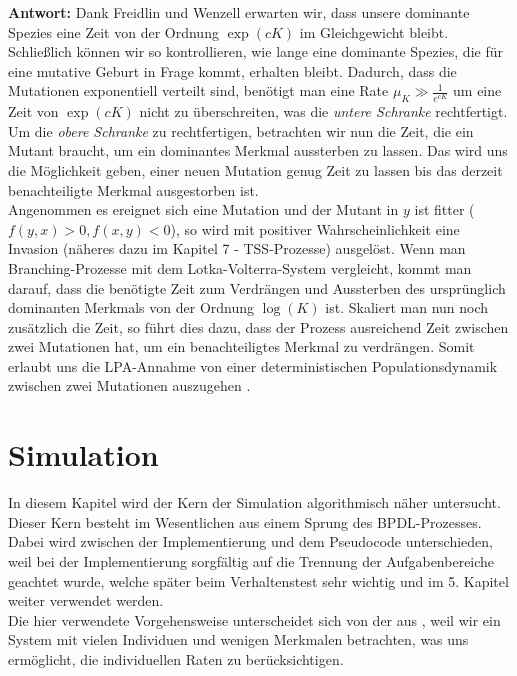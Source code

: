 \documentclass[11pt, a4paper, german]{article}
\theoremstyle{plain}
\begin{document}
	\textbf{Antwort:} Dank Freidlin und Wenzell \cite{freidlin2012random} erwarten wir, dass unsere dominante Spezies eine Zeit von der Ordnung $ \exp(cK) $ im Gleichgewicht bleibt. Schließlich können wir so kontrollieren, wie lange eine dominante Spezies, die für eine mutative Geburt in Frage kommt, erhalten bleibt. Dadurch, dass die Mutationen exponentiell verteilt sind, benötigt man eine Rate $ \mu_K \gg \frac{1}{e^{cK}} $ um eine Zeit von $ \exp(cK) $ nicht zu überschreiten, was die \textit{untere Schranke} rechtfertigt.\\
	Um die \textit{obere Schranke} zu rechtfertigen, betrachten wir nun die Zeit, die ein Mutant braucht, um ein dominantes Merkmal aussterben zu lassen. Das wird uns die Möglichkeit geben, einer neuen Mutation genug Zeit zu lassen bis das derzeit benachteiligte Merkmal ausgestorben ist.\\
	Angenommen es ereignet sich eine Mutation und der Mutant in $ y $ ist fitter ($ f(y,x) > 0, f(x,y) < 0 $), so wird mit positiver Wahrscheinlichkeit eine Invasion (näheres dazu im Kapitel 7 - TSS-Prozesse) ausgelöst. Wenn man Branching-Prozesse mit dem Lotka-Volterra-System vergleicht, kommt man darauf, dass die benötigte Zeit zum Verdrängen und Aussterben des ursprünglich dominanten Merkmals von der Ordnung $ \log(K) $ ist.
%	
	Skaliert man nun noch zusätzlich die Zeit, so führt dies dazu, dass der Prozess ausreichend Zeit zwischen zwei Mutationen hat, um ein benachteiligtes Merkmal zu verdrängen.
	Somit erlaubt uns die LPA-Annahme von einer deterministischen Populationsdynamik zwischen zwei Mutationen auszugehen \cite{raey}.\\
	
	
\section{Simulation}
In diesem Kapitel wird der Kern der Simulation algorithmisch näher untersucht. Dieser Kern besteht im Wesentlichen aus einem Sprung des BPDL-Prozesses.
Dabei wird zwischen der Implementierung und dem Pseudocode unterschieden, weil bei der Implementierung sorgfältig auf die Trennung der Aufgabenbereiche geachtet wurde, welche später beim Verhaltenstest sehr wichtig und im 5. Kapitel weiter verwendet werden.\\
Die hier verwendete Vorgehensweise unterscheidet sich von der aus \cite{fournier2004microscopic}, weil wir ein System mit vielen Individuen und wenigen Merkmalen betrachten, was uns ermöglicht, die individuellen Raten zu berücksichtigen.
\end{document}
